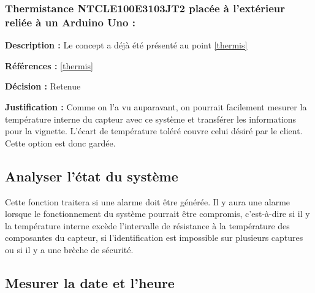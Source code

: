 \subsubsection{Thermistance NTCLE100E3103JT2 placée à l’extérieur reliée à un Arduino Uno :}
\textbf{Description :} Le concept a déjà été présenté au point \ref{thermis}

\textbf{Références :} \ref{thermis}

\textbf{Décision :} Retenue

\textbf{Justification :} Comme on l'a vu auparavant, on pourrait facilement mesurer la température interne du capteur avec ce système et transférer les informations pour la vignette. L'écart de température toléré couvre celui désiré par le client. Cette option est donc gardée.

\begin{table}[!htb]
\footnotesize
\centering
{}
\end{table}


\subsection{Analyser l'état du système}
Cette fonction traitera si une alarme doit être générée. Il y aura une alarme lorsque le fonctionnement du système pourrait être compromis, c'est-à-dire si il y la température interne excède l'intervalle de résistance à la température des composantes du capteur, si l'identification est impossible sur plusieurs captures ou si il y a une brèche de sécurité.

\subsection{Mesurer la date et l'heure}

